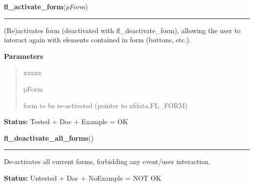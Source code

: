 \hspace{.8\funcindent}\begin{boxedminipage}{\funcwidth}

    \raggedright \textbf{fl\_activate\_form}(\textit{pForm})

    \vspace{-1.5ex}

    \rule{\textwidth}{0.5\fboxrule}
\setlength{\parskip}{2ex}
    (Re)activates form (deactivated with fl\_deactivate\_form), allowing 
    the user to interact again with elements contained in form (buttons, 
    etc.).

\setlength{\parskip}{1ex}
      \textbf{Parameters}
      \vspace{-1ex}

      \begin{quote}
        \begin{Ventry}{xxxxx}

          \item[pForm]

          form to be re-activated (pointer to xfdata.FL\_FORM)

        \end{Ventry}

      \end{quote}

\textbf{Status:} Tested + Doc + Example = OK



    \end{boxedminipage}

    \label{xformslib:library:fl_deactivate_all_forms}

    \vspace{0.5ex}

\hspace{.8\funcindent}\begin{boxedminipage}{\funcwidth}

    \raggedright \textbf{fl\_deactivate\_all\_forms}()

    \vspace{-1.5ex}

    \rule{\textwidth}{0.5\fboxrule}
\setlength{\parskip}{2ex}
    De-activates all current forms, forbidding any event/user interaction.

\setlength{\parskip}{1ex}
\textbf{Status:} Untested + Doc + NoExample = NOT OK



    \end{boxedminipage}


